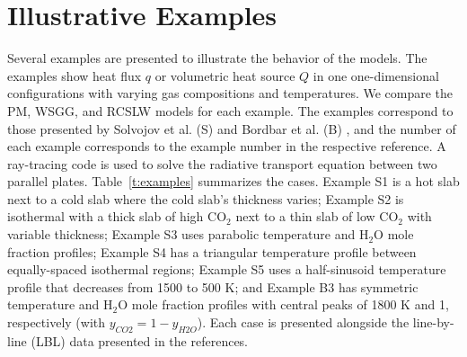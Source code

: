 \documentclass[preprint,12pt, a4paper]{elsarticle}
\begin{document}

\section{Illustrative Examples} \label{s:Examples}

Several examples are presented to illustrate the behavior of the models. The examples show heat flux $q$ or volumetric heat source $Q$ in one one-dimensional configurations with varying gas compositions and temperatures. We compare the PM, WSGG, and RCSLW models for each example. The examples correspond to those presented by Solvojov et al. (S) \cite{Solovjov_2017} and Bordbar et al. (B) \cite{Bordbar_2020}, and the number of each example corresponds to the example number in the respective reference. A ray-tracing code is used to solve the radiative transport equation between two parallel plates. 
Table~\ref{t:examples} summarizes the cases. Example S1 is a hot slab next to a cold slab where the cold slab's thickness varies; Example S2 is isothermal with a thick slab of high CO$_2$ next to a thin slab of low CO$_2$ with variable thickness; Example S3 uses parabolic temperature and H$_2$O mole fraction profiles; Example S4 has a triangular temperature profile between equally-spaced isothermal regions; Example S5 uses a half-sinusoid temperature profile that decreases from 1500 to 500 K; and Example B3 has symmetric temperature and H$_2$O mole fraction profiles with central peaks of 1800 K and 1, respectively (with $y_{CO2}=1-y_{H2O}$). Each case is presented alongside the line-by-line (LBL) data presented in the references. 
%
\end{document}
